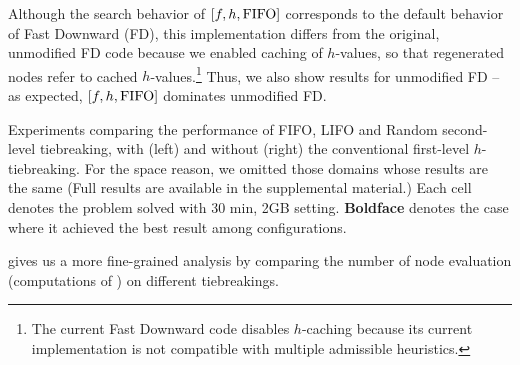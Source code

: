 Although the search behavior of $[f,h,\mbox{FIFO}]$ corresponds to the default behavior of Fast Downward (FD), this implementation differs 
from the original, unmodified FD code because we enabled caching of $h$-values, so that regenerated nodes refer to cached $h$-values.\footnote{The current Fast Downward code disables $h$-caching because its current implementation is not compatible with multiple admissible heuristics.}
Thus, we also show results for unmodified FD -- as expected, $[f,h,\mbox{FIFO}]$ dominates unmodified FD.

\begin{table}[htb]
 \centering {}
 
 \caption{Experiments comparing the performance of FIFO, LIFO and Random
 second-level tiebreaking, with (left) and without (right) the
 conventional first-level $h$-tiebreaking.  For the space reason, we
 omitted those domains whose results are the same (Full results are
 available in the supplemental material.) Each cell denotes the problem
 solved with 30 min, 2GB setting. \textbf{Boldface} denotes the case
 where it achieved the best result among configurations.}
 \label{single-coverage}
\end{table}

 gives us a more fine-grained analysis by comparing the
number of node evaluation (computations of \lmcut) on
different tiebreakings.

